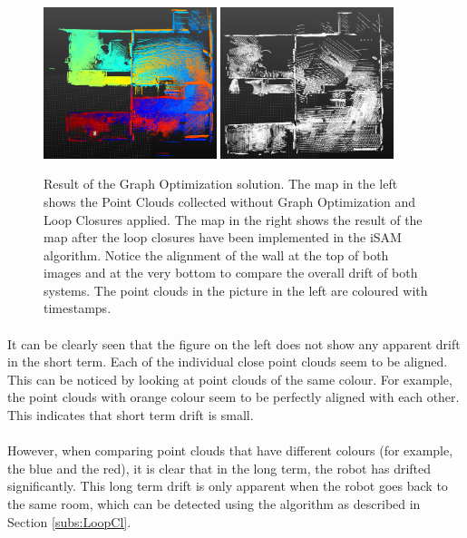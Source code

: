 \documentclass[12pt]{article}
\begin{document}
	\begin{figure}[ht]
		\centering
		\includegraphics[width=0.45\textwidth]{ResultNoLoopClosure}
		\includegraphics[width=0.45\textwidth]{ResultLoopClosure}
		\caption{Result of the Graph Optimization solution. The map in the left shows the Point Clouds collected without Graph Optimization and Loop Closures applied. The map in the right shows the result of the map after the loop closures have been implemented in the iSAM algorithm. Notice the alignment of the wall at the top of both images and at the very bottom to compare the overall drift of both systems. The point clouds in the picture in the left are coloured with timestamps.}
		\label{fig:GraphOptimization1}	
	\end{figure}
	
	\paragraph{}
	It can be clearly seen that the figure on the left does not show any apparent drift in the short term. Each of the individual close point clouds seem to be aligned. This can be noticed by looking at point clouds of the same colour. For example, the point clouds with orange colour seem to be perfectly aligned with each other. This indicates that short term drift is small.
	
	\paragraph{}
	However, when comparing point clouds that have different colours (for example, the blue and the red), it is clear that in the long term, the robot has drifted significantly. This long term drift is only apparent when the robot goes back to the same room, which can be detected using the algorithm as described in Section \ref{subs:LoopCl}.
	
\end{document}
